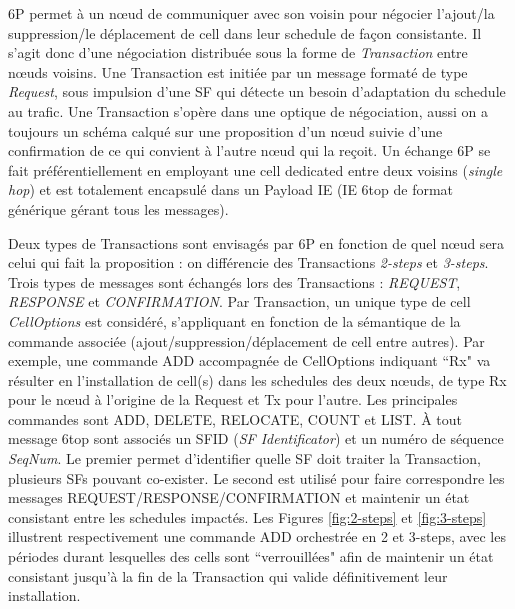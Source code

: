 \documentclass[]{report}
\begin{document}
\par 6P permet à un nœud de communiquer avec son voisin pour négocier l'ajout/la suppression/le déplacement de cell dans leur schedule de façon consistante. Il s'agit donc d'une négociation distribuée sous la forme de \textit{Transaction} entre nœuds voisins. Une Transaction est initiée par un message formaté de type \textit{Request}, sous impulsion d'une SF qui détecte un besoin d'adaptation du schedule au trafic. Une Transaction s'opère dans une optique de négociation, aussi on a toujours un schéma calqué sur une proposition d'un nœud suivie d'une confirmation de ce qui convient à l'autre nœud qui la reçoit. Un échange 6P se fait préférentiellement en employant une cell dedicated entre deux voisins (\textit{single hop}) et est totalement encapsulé dans un Payload IE (IE 6top de format générique gérant tous les messages).\\

\par Deux types de Transactions sont envisagés par 6P en fonction de quel nœud sera celui qui fait la proposition : on différencie des Transactions \textit{2-steps} et \textit{3-steps}. Trois types de messages sont échangés lors des Transactions : \textit{REQUEST}, \textit{RESPONSE} et \textit{CONFIRMATION}. Par Transaction, un unique type de cell \textit{CellOptions} est considéré, s'appliquant en fonction de la sémantique de la commande associée (ajout/suppression/déplacement de cell entre autres). Par exemple, une commande ADD accompagnée de CellOptions indiquant ``Rx" va résulter en l'installation de cell(s) dans les schedules des deux nœuds, de type Rx pour le nœud à l'origine de la Request et Tx pour l'autre. Les principales commandes sont ADD, DELETE, RELOCATE, COUNT et LIST. À tout message 6top sont associés un SFID (\textit{SF Identificator}) et un numéro de séquence \textit{SeqNum}. Le premier permet d'identifier quelle SF doit traiter la Transaction, plusieurs SFs pouvant co-exister. Le second est utilisé pour faire correspondre les messages REQUEST/RESPONSE/CONFIRMATION et maintenir un état consistant entre les schedules impactés. Les Figures \ref{fig:2-steps} et \ref{fig:3-steps} illustrent respectivement une commande ADD orchestrée en 2 et 3-steps, avec les périodes durant lesquelles des cells sont ``verrouillées" afin de maintenir un état consistant jusqu'à la fin de la Transaction qui valide définitivement leur installation.\\
\end{document}
